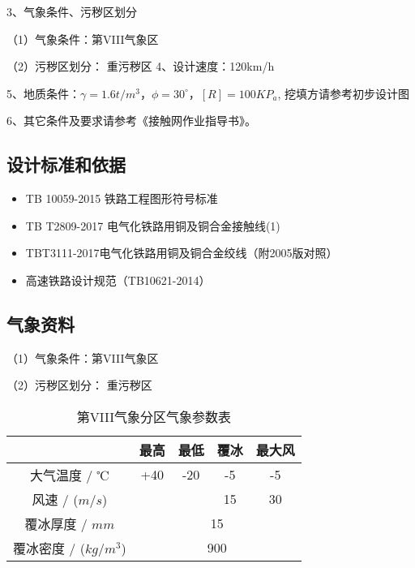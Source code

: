 3、气象条件、污秽区划分

（1）气象条件：第VIII气象区

（2）污秽区划分： 重污秽区
4、设计速度：120km/h

5、地质条件：$\gamma =1.6t/m^3\text{，}\phi =30^{\circ}\text{，}\left[ R \right] =100KP_a
$, 挖填方请参考初步设计图

6、其它条件及要求请参考《接触网作业指导书》。

\subsection{设计标准和依据}
\begin{itemize}
	\item TB 10059-2015 铁路工程图形符号标准 
	\item TB T2809-2017 电气化铁路用铜及铜合金接触线(1)
	\item TBT3111-2017电气化铁路用铜及铜合金绞线（附2005版对照） 
	\item 高速铁路设计规范（TB10621-2014）
\end{itemize}

\subsection{气象资料}
（1）气象条件：第VIII气象区

（2）污秽区划分： 重污秽区

\begin{table}[h]
	\centering
	\caption{第VIII气象分区气象参数表}
	\label{tab:第VIII气象分区气象参数表}

		\begin{tabular}{|c|cccc|}
			\hline
			& \multicolumn{1}{c|}{最高}  & \multicolumn{1}{c|}{最低}  & \multicolumn{1}{c|}{覆冰} & 最大风 \\ \hline
			大气温度 / ℃     & \multicolumn{1}{c|}{+40} & \multicolumn{1}{c|}{-20} & \multicolumn{1}{c|}{-5} & -5  \\ \hline
			风速 / ($m/s$) & \multicolumn{1}{c|}{}    & \multicolumn{1}{c|}{}    & \multicolumn{1}{c|}{15} & 30  \\ \hline
			覆冰厚度 / $mm$       & \multicolumn{4}{c|}{15}  \\ \hline
			覆冰密度 / ($kg/m^3$) & \multicolumn{4}{c|}{900} \\ \hline
		\end{tabular}%
	
\end{table}

